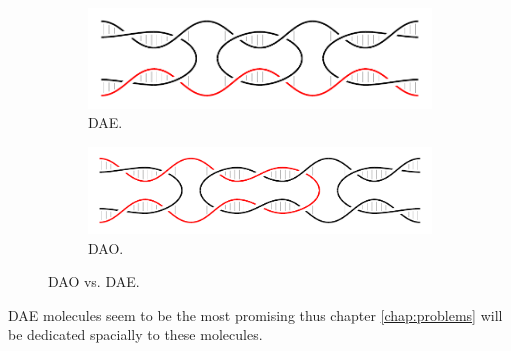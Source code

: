 		\begin{figure}[H]
		\begin{center}
			\begin{subfigure}[b]{0.433\textwidth} %
				\includegraphics[width=\textwidth]{./figures/dao-dae/dae.pdf}
				\caption{DAE.}
				\label{fig:dao}
			\end{subfigure}
			\begin{subfigure}[b]{0.5\textwidth} %
				\includegraphics[width=\textwidth]{./figures/dao-dae/dao.pdf}
				\caption{DAO.}
				\label{fig:dae}
			\end{subfigure}
			\caption{DAO vs. DAE.}
			\label{fig:dao-dae}
		\end{center}
		\end{figure}
		
		
		
		DAE molecules seem to be the most promising %
		thus chapter \ref{chap:problems} will be dedicated spacially to these molecules.
		
		
		
		
